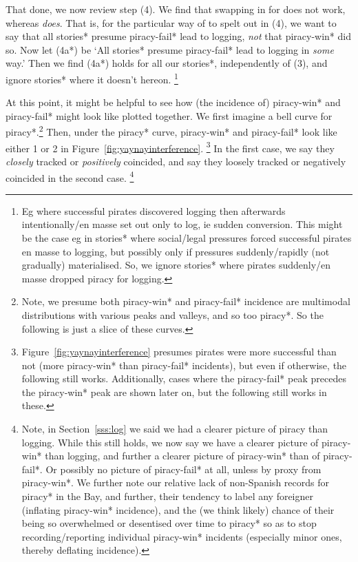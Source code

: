 		That done, we now review step (4). We find that swapping in  for  does not work, whereas  \emph{does}. That is, for the particular way of  to spelt out in (4), we want to say that all stories* presume piracy-fail* lead to logging, \emph{not} that piracy-win* did so.
		Now let (4a*) be `All stories* presume piracy-fail* lead to logging in \emph{some} way.' Then we find (4a*) holds for all our stories*, independently of (3), and ignore stories* where it doesn't hereon.%
		\footnote{Eg where successful pirates discovered logging then afterwards intentionally/en masse set out only to log, ie sudden conversion. This might be the case eg in stories* where social/legal pressures forced successful pirates en masse to logging, but possibly only if pressures suddenly/rapidly (not gradually) materialised. So, we ignore stories* where pirates suddenly/en masse dropped piracy for logging.}
		
		At this point, it might be helpful to see how (the incidence of) piracy-win* and piracy-fail* might look like plotted together. We first imagine a bell curve for piracy*.\footnote{Note, we presume both piracy-win* and piracy-fail* incidence are multimodal distributions with various peaks and valleys, and so too piracy*. So the following is just a slice of these curves.} Then, under the piracy* curve, piracy-win* and piracy-fail* look like either 1 or 2 in Figure~\ref{fig:yaynayinterference}.%
		\footnote{Figure~\ref{fig:yaynayinterference} presumes pirates were more successful than not (more piracy-win* than piracy-fail* incidents), but even if otherwise, the following still works. Additionally, cases where the piracy-fail* peak precedes the piracy-win* peak are shown later on, but the following still works in these.}
		In the first case, we say they \emph{closely} tracked or \emph{positively} coincided, and say they loosely tracked or negatively coincided in the second case.%
		\footnote{Note, in Section~\ref{sss:log} we said we had a clearer picture of piracy than logging. While this still holds, we now say we have a clearer picture of piracy-win* than logging, and further a clearer picture of piracy-win* than of piracy-fail*. Or possibly no picture of piracy-fail* at all, unless by proxy from piracy-win*. We further note our relative lack of non-Spanish records for piracy* in the Bay, and further, their tendency to label any foreigner  (inflating piracy-win* incidence), and the (we think likely) chance of their being so overwhelmed or desentised over time to piracy* so as to stop recording/reporting individual piracy-win* incidents (especially minor ones, thereby deflating incidence).}
		

